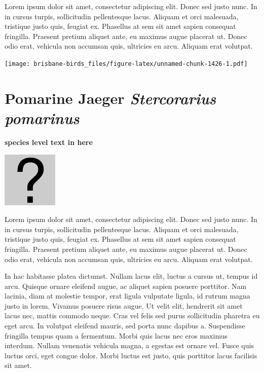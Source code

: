 \documentclass[]{book}
\let\origfigure\figure
\let\endorigfigure\endfigure
\renewenvironment{figure}[1][2] {
  \expandafter\origfigure\expandafter[H]
} {
  \endorigfigure
}
\begin{document}
Lorem ipsum dolor sit amet, consectetur adipiscing elit. Donec sed justo
nunc. In in cursus turpis, sollicitudin pellentesque lacus. Aliquam et
orci malesuada, tristique justo quis, feugiat ex. Phasellus at sem sit
amet sapien consequat fringilla. Praesent pretium aliquet ante, eu
maximus augue placerat ut. Donec odio erat, vehicula non accumsan quis,
ultricies eu arcu. Aliquam erat volutpat.

\texttt{[image: brisbane-birds\_files/figure-latex/unnamed-chunk-1426-1.pdf]}

\section{\texorpdfstring{Pomarine Jaeger \emph{Stercorarius
pomarinus}}{Pomarine Jaeger Stercorarius pomarinus}}\label{pomarine-jaeger-stercorarius-pomarinus}

\textbf{species level text in here}

\begin{figure}
\centering
\includegraphics{assets/missing.png}
\caption{No image for species}
\end{figure}

Lorem ipsum dolor sit amet, consectetur adipiscing elit. Donec sed justo
nunc. In in cursus turpis, sollicitudin pellentesque lacus. Aliquam et
orci malesuada, tristique justo quis, feugiat ex. Phasellus at sem sit
amet sapien consequat fringilla. Praesent pretium aliquet ante, eu
maximus augue placerat ut. Donec odio erat, vehicula non accumsan quis,
ultricies eu arcu. Aliquam erat volutpat.

In hac habitasse platea dictumst. Nullam lacus elit, luctus a cursus ut,
tempus id arcu. Quisque ornare eleifend augue, ac aliquet sapien posuere
porttitor. Nam lacinia, diam at molestie tempor, erat ligula vulputate
ligula, id rutrum magna justo in lorem. Vivamus posuere risus augue. Ut
velit elit, hendrerit sit amet lacus nec, mattis commodo neque. Cras vel
felis sed purus sollicitudin pharetra eu eget arcu. In volutpat eleifend
mauris, sed porta nunc dapibus a. Suspendisse fringilla tempus quam a
fermentum. Morbi quis lacus nec eros maximus interdum. Nullam venenatis
vehicula magna, a egestas est ornare vel. Fusce quis luctus orci, eget
congue dolor. Morbi luctus est justo, quis porttitor lacus facilisis sit
amet.
\end{document}
